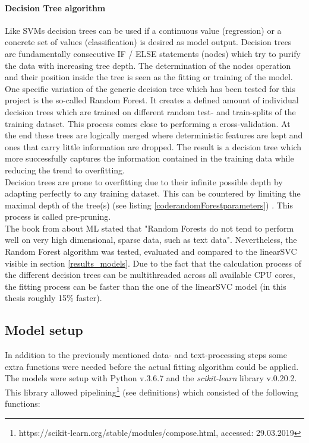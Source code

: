 \paragraph*{Decision Tree algorithm}
Like SVMs decision trees can be used if a continuous value (regression) or a concrete set of values (classification) is desired as model output. Decision trees are fundamentally consecutive IF / ELSE statements (nodes) which try to purify the data with increasing tree depth. The determination of the nodes operation and their position inside the tree is seen as the fitting or training of the model.\\
One specific variation of the generic decision tree which has been tested for this project is the so-called Random Forest. It creates a defined amount of individual decision trees which are trained on different random test- and train-splits of the training dataset. This process comes close to performing a cross-validation. At the end these trees are logically merged where deterministic features are kept and ones that carry little information are dropped. The result is a decision tree which more successfully captures the information contained in the training data while reducing the trend to overfitting.\\
Decision trees are prone to overfitting due to their infinite possible depth by adapting perfectly to any training dataset. This can be countered by limiting the maximal depth of the tree(s) (see listing \ref{coderandomForestparameters}) . This process is called pre-pruning.\\
\newline
 The book from \textcite{Guido2016} about ML stated that "Random Forests do not tend to perform well on very high dimensional, sparse data, such as text data". Nevertheless, the Random Forest algorithm was tested, evaluated and compared to the linearSVC visible in section \ref{results_models}. Due to the fact that the calculation process of the different decision trees can be multithreaded across all available CPU cores, the fitting process can be faster than the one of the linearSVC model (in this thesis roughly 15\% faster). 

\subsection{Model setup} \label{model_setup}
In addition to the previously mentioned data- and text-processing steps some extra functions were needed before the actual fitting algorithm could be applied. The models were setup with Python v.3.6.7 and the \textit{scikit-learn} library v.0.20.2. This library allowed pipelining\footnote{https://scikit-learn.org/stable/modules/compose.html, accessed: 29.03.2019} (see definitions) which consisted of the following functions:

